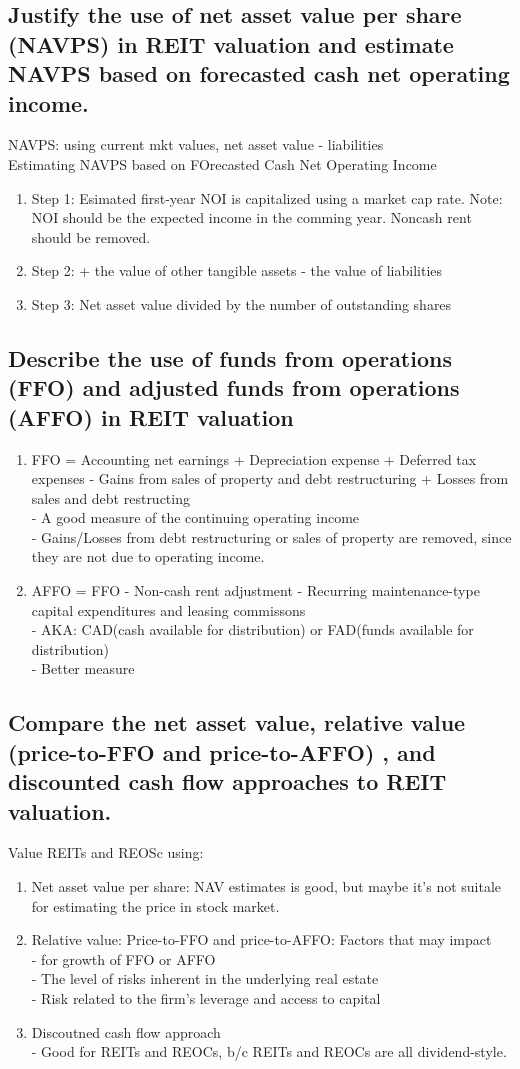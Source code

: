 \documentclass{article}
\newcommand{\be}{\begin{enumerate}}
\newcommand{\ee}{\end{enumerate}}
\begin{document}
\subsection{Justify the use of net asset value per share (NAVPS) in REIT valuation and estimate
NAVPS based on forecasted cash net operating income.}
NAVPS: using current mkt values, net asset value - liabilities
\\ Estimating NAVPS based on FOrecasted Cash Net Operating Income
\be
    \item Step 1: Esimated first-year NOI is capitalized using a market cap rate. Note: 
    NOI should be the expected income in the comming year. Noncash rent should be removed.
    \item Step 2: + the value of other tangible assets - the value of liabilities
    \item Step 3: Net asset value divided by the number of outstanding shares
\ee
\subsection{Describe the use of funds from operations (FFO) and adjusted funds from operations
(AFFO) in REIT valuation}
\be
    \item FFO = Accounting net earnings + Depreciation expense + Deferred tax expenses
    - Gains from sales of property and debt restructuring + Losses from sales and debt restructing
    \\ - A good measure of the continuing operating income
    \\ - Gains/Losses from debt restructuring or sales of property are removed, since they are not due to operating income.
    \item AFFO = FFO - Non-cash rent adjustment - Recurring maintenance-type capital expenditures
    and leasing commissons
    \\ - AKA: CAD(cash available for distribution) or FAD(funds available for distribution)
    \\ - Better measure
\ee
\subsection{Compare the net asset value, relative value (price-to-FFO and price-to-AFFO)
, and discounted cash flow approaches to REIT valuation.}
Value REITs and REOSc using:
\be
    \item Net asset value per share: NAV estimates is good, but maybe it's not suitale
    for estimating the price in stock market.
    \item Relative value: Price-to-FFO and price-to-AFFO: Factors that may impact
    \\- for growth of FFO or AFFO
    \\- The level of risks inherent in the underlying real estate
    \\- Risk related to the firm's leverage and access to capital
    \item Discoutned cash flow approach
    \\- Good for REITs and REOCs, b/c REITs and REOCs are all dividend-style.
\ee
\end{document}
